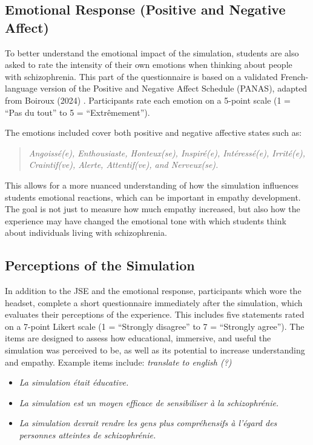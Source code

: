\subsection{Emotional Response (Positive and Negative Affect)}

To better understand the emotional impact of the simulation, students are also asked to rate the intensity of their own emotions when thinking about people with schizophrenia. This part of the questionnaire is based on a validated French-language version of the Positive and Negative Affect Schedule (PANAS), adapted from Boiroux (2024) \cite{Boiroux2024}. Participants rate each emotion on a 5-point scale (1 = “Pas du tout” to 5 = “Extrêmement”).

The emotions included cover both positive and negative affective states such as:

\begin{quote}
    \textit{Angoissé(e), Enthousiaste, Honteux(se), Inspiré(e), Intéressé(e), Irrité(e), Craintif(ve), Alerte, Attentif(ve), and Nerveux(se).}
\end{quote}

This allows for a more nuanced understanding of how the simulation influences students emotional reactions, which can be important in empathy development. The goal is not just to measure how much empathy increased, but also how the experience may have changed the emotional tone with which students think about individuals living with schizophrenia. 

\subsection{Perceptions of the Simulation}

In addition to the JSE and the emotional response, participants which wore the headset, complete a short questionnaire immediately after the simulation, which evaluates their perceptions of the experience. This includes five statements rated on a 7-point Likert scale (1 = “Strongly disagree” to 7 = “Strongly agree”). The items are designed to assess how educational, immersive, and useful the simulation was perceived to be, as well as its potential to increase understanding and empathy. Example items include: \emph{translate to english (?)}

\begin{itemize}
    \item \textit{La simulation était éducative.}
    \item \textit{La simulation est un moyen efficace de sensibiliser à la schizophrénie.}
    \item \textit{La simulation devrait rendre les gens plus compréhensifs à l’égard des personnes atteintes de schizophrénie.}
\end{itemize}

